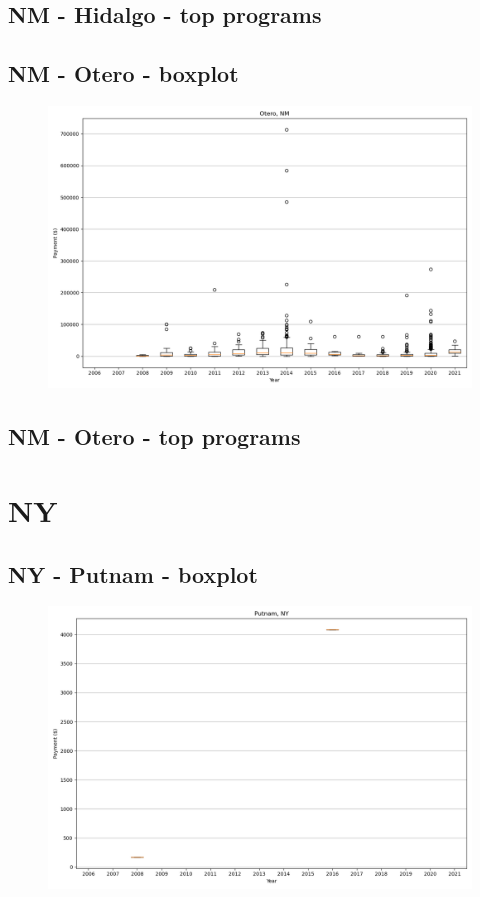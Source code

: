 \subsection*{NM - Hidalgo - top programs}

\newpage
\subsection*{NM - Otero - boxplot}
\begin{figure}[h]
\centering
\includegraphics[width=7in]{../output/boxplots/counties/Otero-NM_boxplot.png}
\end{figure}


\subsection*{NM - Otero - top programs}

\newpage
\section*{NY}
\subsection*{NY - Putnam - boxplot}
\begin{figure}[h]
\centering
\includegraphics[width=7in]{../output/boxplots/counties/Putnam-NY_boxplot.png}
\end{figure}


